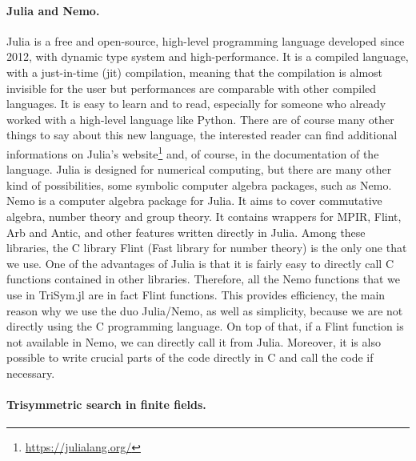 \paragraph{Julia and Nemo.} Julia is a free and open-source, high-level programming language
developed since 2012, with dynamic type system and high-performance. It is
a compiled language, with a just-in-time (jit) compilation, meaning that the
compilation is almost invisible for the user but performances are comparable
with other compiled languages. It is easy to learn and to read, especially
for someone who already worked with a high-level language like Python.
There are of course many other things to say about this new language, the
interested reader can find additional informations on Julia’s
website\footnote{\url{https://julialang.org/}} and, of
course, in the documentation of the language. Julia is designed for numerical
computing, but there are many other kind of possibilities, \eg some symbolic computer algebra packages, such as
Nemo. Nemo is a computer algebra package for Julia. It aims to cover
commutative algebra, number theory and group theory. It contains wrappers
for MPIR, Flint, Arb and Antic, and other features written directly in Julia. Among
these libraries, the C library Flint (Fast library for number theory) is the
only one that we use.
One of the advantages of Julia is that it is fairly easy
to directly call C functions contained in other libraries. Therefore, all the
Nemo functions that we use in TriSym.jl are in fact Flint functions. This
provides efficiency, the main reason why we use the duo Julia/Nemo, as well
as simplicity, because we are not directly using the C programming language.
On top of that, if a Flint function is not available in Nemo, we can directly
call it from Julia. Moreover, it is also possible to write crucial parts of the code
directly in C and call the code if necessary.

\paragraph{Trisymmetric search in finite fields.}


